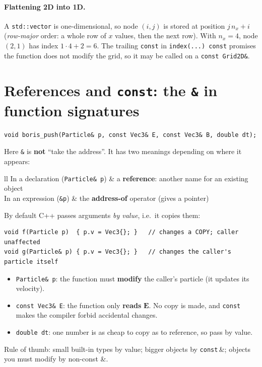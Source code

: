 \documentclass[11pt,a4paper]{article}
\newcommand{\EE}{\mathbf{E}}
\begin{document}
\paragraph{Flattening 2D into 1D.} A \texttt{std::vector} is one-dimensional, so node $(i,j)$ is stored at
position $j\,n_x+i$ (\emph{row-major} order: a whole row of $x$ values, then the next row). With $n_x=4$,
node $(2,1)$ has index $1\cdot4+2=6$. The trailing \lstinline|const| in \texttt{index(...) const} promises
the function does not modify the grid, so it may be called on a \lstinline|const Grid2D&|.

\section{References and \texttt{const}: the \texttt{\&} in function signatures}

\begin{lstlisting}
void boris_push(Particle& p, const Vec3& E, const Vec3& B, double dt);
\end{lstlisting}
Here \texttt{\&} is \textbf{not} ``take the address''. It has two meanings depending on where it appears:
\begin{center}
\begin{tabular}{ll}
\toprule
In a declaration (\lstinline|Particle& p|) & a \textbf{reference}: another name for an existing object\\
In an expression (\lstinline|&p|) & the \textbf{address-of} operator (gives a pointer)\\
\bottomrule
\end{tabular}
\end{center}
By default C++ passes arguments \emph{by value}, i.e.\ it copies them:
\begin{lstlisting}
void f(Particle p)  { p.v = Vec3{}; }   // changes a COPY; caller unaffected
void g(Particle& p) { p.v = Vec3{}; }   // changes the caller's particle itself
\end{lstlisting}
\begin{itemize}
  \item \lstinline|Particle& p|: the function must \textbf{modify} the caller's particle (it updates its velocity).
  \item \lstinline|const Vec3& E|: the function only \textbf{reads} $\EE$. No copy is made, and \texttt{const}
        makes the compiler forbid accidental changes.
  \item \lstinline|double dt|: one number is as cheap to copy as to reference, so pass by value.
\end{itemize}
Rule of thumb: small built-in types by value; bigger objects by \texttt{const}\,\&; objects you must
modify by non-const \&.
\end{document}
